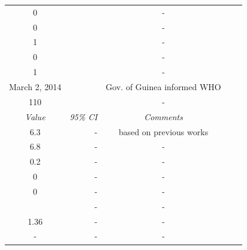 \documentclass[10pt, journal,onecolumn]{IEEEtran}
\begin{document}
\begin{appendix}
\begin{table}[h]
{\begin{tabular}{@{}crccc@{}}
 0& & -\\
 0& & -\\
 1& & -\\
 0& & -\\
 1& &-\\
 March 2, 2014 &  & Gov. of Guinea informed WHO\\
110 & & -\\
\midrule
 \textit{Value} & \textit{95\% CI} & \textit{Comments} \\
\midrule
6.3 & - & based on previous works \cite{}\\
6.8 & - & -\\
0.2 & - & -\\
0 & - & -\\
0 & - & -\\
 & - & -\\
1.36 &- &-\\
- & - &-\\
\end{tabular}
}
\end{table}


\end{appendix}
\end{document}
